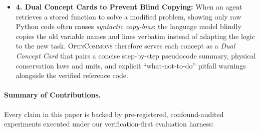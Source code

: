 \documentclass[10pt,twocolumn]{article}
\begin{document}
\begin{itemize}
    \item \textbf{4. Dual Concept Cards to Prevent Blind Copying:} When an agent retrieves a stored function to solve a modified problem, showing only raw Python code often causes \emph{syntactic copy-bias}: the language model blindly copies the old variable names and lines verbatim instead of adapting the logic to the new task. \textsc{OpenCommons} therefore serves each concept as a \emph{Dual Concept Card} that pairs a concise step-by-step pseudocode summary, physical conservation laws and units, and explicit ``what-not-to-do'' pitfall warnings alongside the verified reference code.
\end{itemize}

\paragraph{Summary of Contributions.}
Every claim in this paper is backed by pre-registered, confound-audited experiments executed under our verification-first evaluation harness:
\end{document}
